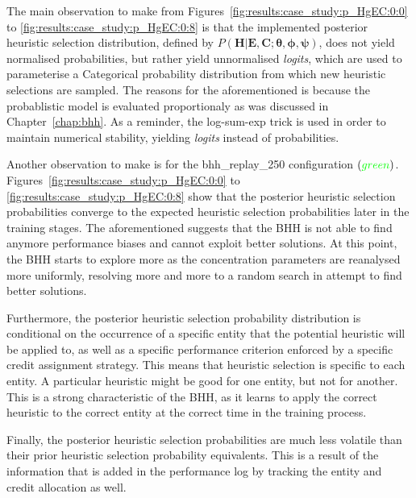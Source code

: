 The main observation to make from Figures~\ref{fig:results:case_study:p_HgEC:0:0} to \ref{fig:results:case_study:p_HgEC:0:8} is that the implemented posterior heuristic selection distribution, defined by $P(\boldsymbol{H} \vert \boldsymbol{E}, \boldsymbol{C}; \boldsymbol{\theta}, \boldsymbol{\phi}, \boldsymbol{\psi})$, does not yield normalised probabilities, but rather yield unnormalised \textit{logits}, which are used to parameterise a Categorical probability distribution from which new heuristic selections are sampled. The reasons for the aforementioned is because the probablistic model is evaluated proportionaly as was discussed in Chapter~\ref{chap:bhh}. As a reminder, the log-sum-exp trick is used in order to maintain numerical stability, yielding \textit{logits} instead of probabilities.

Another observation to make is for the bhh\_replay\_250 configuration $(\textcolor{green}{green})$. Figures~\ref{fig:results:case_study:p_HgEC:0:0} to \ref{fig:results:case_study:p_HgEC:0:8} show that the posterior heuristic selection probabilities converge to the expected heuristic selection probabilities later in the training stages. The aforementioned suggests that the \acs{BHH} is not able to find anymore performance biases and cannot exploit better solutions. At this point, the \acs{BHH} starts to explore more as the concentration parameters are reanalysed more uniformly, resolving more and more to a random search in attempt to find better solutions.

Furthermore, the posterior heuristic selection probability distribution is conditional on the occurrence of a specific entity that the potential heuristic will be applied to, as well as a specific performance criterion enforced by a specific credit assignment strategy. This means that heuristic selection is specific to each entity. A particular heuristic might be good for one entity, but not for another. This is a strong characteristic of the \acs{BHH}, as it learns to apply the correct heuristic to the correct entity at the correct time in the training process.

Finally, the posterior heuristic selection probabilities are much less volatile than their prior heuristic selection probability equivalents. This is a result of the information that is added in the performance log by tracking the entity and credit allocation as well.

